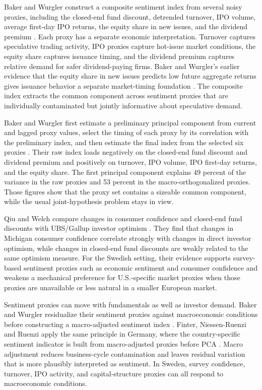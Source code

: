 \documentclass[11pt]{article}
\begin{document}
Baker and Wurgler construct a composite sentiment index from several noisy proxies, including the closed-end fund discount, detrended turnover, IPO volume, average first-day IPO returns, the equity share in new issues, and the dividend premium \citep{baker2006sentiment,baker2007}. Each proxy has a separate economic interpretation. Turnover captures speculative trading activity, IPO proxies capture hot-issue market conditions, the equity share captures issuance timing, and the dividend premium captures relative demand for safer dividend-paying firms. Baker and Wurgler's earlier evidence that the equity share in new issues predicts low future aggregate returns gives issuance behavior a separate market-timing foundation \citep{baker2000equityshare}. The composite index extracts the common component across sentiment proxies that are individually contaminated but jointly informative about speculative demand.

Baker and Wurgler first estimate a preliminary principal component from current and lagged proxy values, select the timing of each proxy by its correlation with the preliminary index, and then estimate the final index from the selected six proxies \citep{baker2006sentiment}. Their raw index loads negatively on the closed-end fund discount and dividend premium and positively on turnover, IPO volume, IPO first-day returns, and the equity share. The first principal component explains 49 percent of the variance in the raw proxies and 53 percent in the macro-orthogonalized proxies. Those figures show that the proxy set contains a sizeable common component, while the usual joint-hypothesis problem stays in view.

Qiu and Welch compare changes in consumer confidence and closed-end fund discounts with UBS/Gallup investor optimism \citep{qiu2006sentimentmeasures}. They find that changes in Michigan consumer confidence correlate strongly with changes in direct investor optimism, while changes in closed-end fund discounts are weakly related to the same optimism measure. For the Swedish setting, their evidence supports survey-based sentiment proxies such as economic sentiment and consumer confidence and weakens a mechanical preference for U.S.-specific market proxies when those proxies are unavailable or less natural in a smaller European market.

Sentiment proxies can move with fundamentals as well as investor demand. Baker and Wurgler residualize their sentiment proxies against macroeconomic conditions before constructing a macro-adjusted sentiment index \citep{baker2006sentiment}. Finter, Niessen-Ruenzi and Ruenzi apply the same principle in Germany, where the country-specific sentiment indicator is built from macro-adjusted proxies before PCA \citep{finter2012german}. Macro adjustment reduces business-cycle contamination and leaves residual variation that is more plausibly interpreted as sentiment. In Sweden, survey confidence, turnover, IPO activity, and capital-structure proxies can all respond to macroeconomic conditions.
\end{document}
